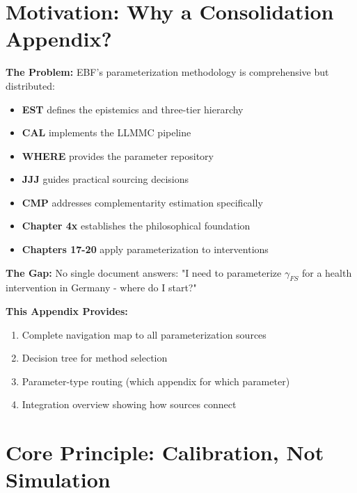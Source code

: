 \section{Motivation: Why a Consolidation Appendix?}
\label{sec:pm-motivation}

\textbf{The Problem:} EBF's parameterization methodology is comprehensive but distributed:

\begin{itemize}[nosep]
    \item \textbf{EST} defines the epistemics and three-tier hierarchy
    \item \textbf{CAL} implements the LLMMC pipeline
    \item \textbf{WHERE} provides the parameter repository
    \item \textbf{JJJ} guides practical sourcing decisions
    \item \textbf{CMP} addresses complementarity estimation specifically
    \item \textbf{Chapter 4x} establishes the philosophical foundation
    \item \textbf{Chapters 17-20} apply parameterization to interventions
\end{itemize}

\textbf{The Gap:} No single document answers: "I need to parameterize $\gamma_{FS}$ for a health intervention in Germany - where do I start?"

\textbf{This Appendix Provides:}
\begin{enumerate}[nosep]
    \item Complete navigation map to all parameterization sources
    \item Decision tree for method selection
    \item Parameter-type routing (which appendix for which parameter)
    \item Integration overview showing how sources connect
\end{enumerate}


\section{Core Principle: Calibration, Not Simulation}
\label{sec:pm-principle}

